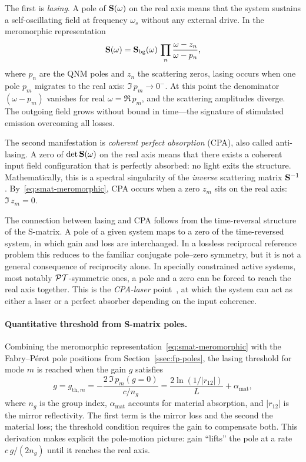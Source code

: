 The first is \emph{lasing}. A pole of $\mathbf{S}(\omega)$ on the real
axis means that the system sustains a self-oscillating field at
frequency $\omega_s$ without any external drive. In the meromorphic
representation
\begin{equation}
 \mathbf{S}(\omega) = \mathbf{S}_{\mathrm{bg}}(\omega)\,
 \prod_n \frac{\omega - z_n}{\omega - p_n},
 \label{eq:smat-meromorphic}
\end{equation}
where $p_n$ are the QNM poles and $z_n$ the scattering zeros, lasing
occurs when one pole $p_m$ migrates to the real axis:
$\Im\,p_m \to 0^-$. At this point the denominator
$(\omega - p_m)$ vanishes for real $\omega = \Re\,p_m$, and the
scattering amplitudes diverge. The outgoing field grows without bound
in time---the signature of stimulated emission overcoming all losses.

The second manifestation is \emph{coherent perfect absorption} (CPA),
also called anti-lasing. A zero of $\det\mathbf{S}(\omega)$ on the real
axis means that there exists a coherent input field configuration that
is perfectly absorbed: no light exits the structure. Mathematically,
this is a spectral singularity of the \emph{inverse} scattering matrix
$\mathbf{S}^{-1}$. By~\eqref{eq:smat-meromorphic}, CPA occurs when a zero
$z_m$ sits on the real axis: $\Im\,z_m = 0$.

The connection between lasing and CPA follows from the time-reversal
structure of the S-matrix. A pole of a given system maps to a zero of
the time-reversed system, in which gain and loss are interchanged. In a
lossless reciprocal reference problem this reduces to the familiar
conjugate pole--zero symmetry, but it is not a general consequence of
reciprocity alone. In specially constrained active systems, most notably
$\mathcal{PT}$-symmetric ones, a pole and a zero can be forced to reach the real
axis together. This is the \emph{CPA-laser}
point~\cite{chong2010symmetry,sweeney2019perfectly}, at which the system
can act as either a laser or a perfect absorber depending on the input
coherence.

\paragraph{Quantitative threshold from S-matrix poles.}
Combining the meromorphic representation~\eqref{eq:smat-meromorphic}
with the Fabry--P\'erot pole positions from
Section~\ref{ssec:fp-poles}, the lasing threshold for mode $m$ is
reached when the gain $g$ satisfies
\begin{equation}
 g = g_{\mathrm{th},m}
 = -\frac{2\,\Im\,p_m(g=0)}{c/n_g}
 = \frac{2\ln(1/|r_{12}|)}{L}
 + \alpha_{\mathrm{mat}},
 \label{eq:threshold-from-poles}
\end{equation}
where $n_g$ is the group index, $\alpha_{\mathrm{mat}}$ accounts for
material absorption, and $|r_{12}|$ is the mirror reflectivity. The
first term is the mirror loss and the second the material loss; the
threshold condition requires the gain to compensate both. This
derivation makes explicit the pole-motion picture: gain ``lifts'' the
pole at a rate $c\,g/(2n_g)$ until it reaches the real axis.

